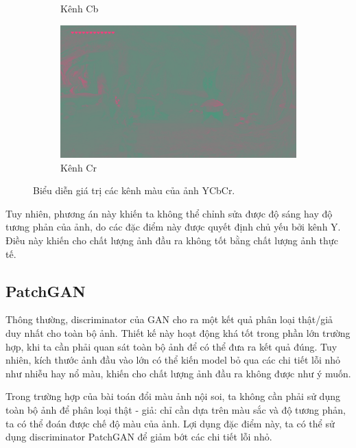 \documentclass[12pt]{extreport}
\begin{document}
\begin{figure}[H]
\begin{subfigure}[H]{0.3\textwidth}
        \caption{Kênh Cb}
    \end{subfigure}
    \begin{subfigure}[H]{0.3\textwidth}
        \centering
        \includegraphics[width=\linewidth]{figure32.png}
        \caption{Kênh Cr}
    \end{subfigure}
    \caption{Biểu diễn giá trị các kênh màu của ảnh YCbCr.}
    \label{figure_ycbcr}
\end{figure}

Tuy nhiên, phương án này khiến ta không thể chỉnh sửa được độ sáng hay độ tương phản của ảnh, do các đặc điểm này được quyết định chủ yếu bởi kênh Y. Điều này khiến cho chất lượng ảnh đầu ra không tốt bằng chất lượng ảnh thực tế.

\subsection{PatchGAN}
\label{patchgan}

Thông thường, discriminator của GAN cho ra một kết quả phân loại thật/giả duy nhất cho toàn bộ ảnh. Thiết kế này hoạt động khá tốt trong phần lớn trường hợp, khi ta cần phải quan sát toàn bộ ảnh để có thể đưa ra kết quả đúng. Tuy nhiên, kích thước ảnh đầu vào lớn có thể kiến model bỏ qua các chi tiết lỗi nhỏ như nhiễu hay nổ màu, khiến cho chất lượng ảnh đầu ra không được như ý muốn.

Trong trường hợp của bài toán đổi màu ảnh nội soi, ta không cần phải sử dụng toàn bộ ảnh để phân loại thật - giả: chỉ cần dựa trên màu sắc và độ tương phản, ta có thể đoán được chế độ màu của ảnh. Lợi dụng đặc điểm này, ta có thể sử dụng discriminator PatchGAN để giảm bớt các chi tiết lỗi nhỏ.
\end{document}
